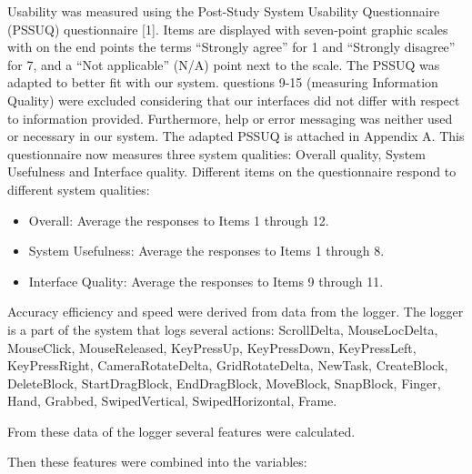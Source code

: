 Usability was measured using the Post-Study System Usability Questionnaire (PSSUQ) questionnaire [1]. Items are displayed with seven-point graphic scales with on the end points the terms “Strongly agree” for 1 and “Strongly disagree” for 7, and a “Not applicable” (N/A) point next to the scale. The PSSUQ was adapted to better fit with our system. questions 9-15 (measuring Information Quality) were excluded considering that our interfaces did not differ with respect to information provided. Furthermore, help or error messaging was neither used or necessary in our system. The adapted PSSUQ is attached in Appendix A. This questionnaire now measures three system qualities: Overall quality, System Usefulness and Interface quality.  Different items on the questionnaire respond to different system qualities:
\begin{itemize}
	\item Overall: Average the responses to Items 1 through 12.
	\item System Usefulness: Average the responses to Items 1 through 8.
    \item Interface Quality: Average the responses to Items 9 through 11.
\end{itemize}

Accuracy efficiency and speed were derived from data from the logger. The logger is a part of the system that logs several actions: ScrollDelta, MouseLocDelta, MouseClick, MouseReleased, KeyPressUp, KeyPressDown, KeyPressLeft, KeyPressRight, CameraRotateDelta, GridRotateDelta, NewTask, CreateBlock, DeleteBlock, StartDragBlock, EndDragBlock, MoveBlock, SnapBlock, Finger, Hand, Grabbed, SwipedVertical, SwipedHorizontal, Frame.

From these data of the logger several features were calculated.

Then these features were combined into the variables:


